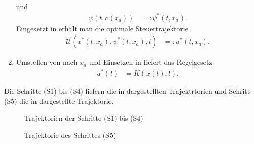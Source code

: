 \begin{enumerate}[label=(S\arabic*)]
\begin{align}
  \end{align}
  und 
  \begin{align*}
  	\psi\left(t,c(x_a) \right) & =: \psi^{\ast}(t,x_a).
  \end{align*}
  Eingesetzt in  erhält man die optimale Steuertrajektorie
  \begin{align}
  	\mathcal{U}\left(x^{\ast}(t,x_a), \psi^{\ast}(t,x_a),t \right) & =: u^{\ast}(t,x_a).	\label{eqn:kap_2_vor_optlsg_s5}
  \end{align}
  \item Umstellen von  nach $x_a$ und Einsetzen in  liefert das Regelgesetz
  \begin{align*}
  	u^{\ast}(t) & = K\left(x(t),t \right).
  \end{align*}
\end{enumerate}
Die Schritte (S1) bis (S4) liefern die in  dargestellten Trajektrtorien und Schritt (S5) die in
 dargestellte Trajektorie.
\begin{figure}[htb]
	\centering
	
	\caption{Trajektorien der Schritte (S1) bis (S4)}
	\label{fig:kap_2_vor_optlsg_s1s4}
\end{figure}
\begin{figure}[htb]
	\centering
	
	\caption{Trajektorie des Schrittes (S5)}
	\label{fig:kap_2_vor_optlsg_s5}
\end{figure}
